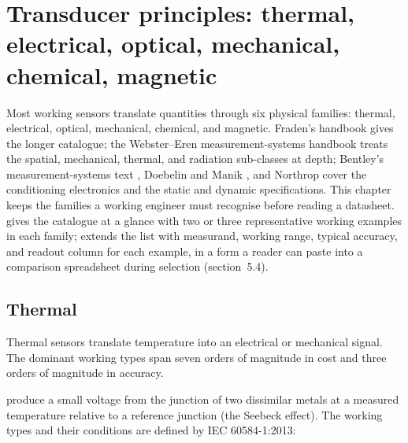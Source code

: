 \section{Transducer principles: thermal, electrical, optical,
mechanical, chemical, magnetic}

Most working sensors translate quantities through six physical
families: thermal, electrical, optical, mechanical, chemical, and
magnetic. Fraden's handbook \cite{text:fraden2016} gives the longer
catalogue; the Webster--Eren measurement-systems handbook
\cite{text:webster2014} treats the spatial, mechanical, thermal, and
radiation sub-classes at depth; Bentley's measurement-systems text
\cite{text:ch05-bentley2005}, Doebelin and Manik
\cite{text:ch05-doebelin2007}, and Northrop
\cite{text:ch05-northrop2014} cover the conditioning electronics and
the static and dynamic specifications. This chapter keeps the
families a working engineer must recognise before reading a
datasheet.  gives the
catalogue at a glance with two or three representative working
examples in each family;
 extends the list with measurand,
working range, typical accuracy, and readout column for each
example, in a form a reader can paste into a comparison spreadsheet
during selection (section~5.4).



\subsection{Thermal}

Thermal sensors translate temperature into an electrical or
mechanical signal. The dominant working types span seven orders of
magnitude in cost and three orders of magnitude in accuracy.

 produce a small voltage from the
junction of two dissimilar metals at a measured temperature
relative to a reference junction (the Seebeck effect). The
working types and their conditions are defined by IEC 60584-1:2013:

